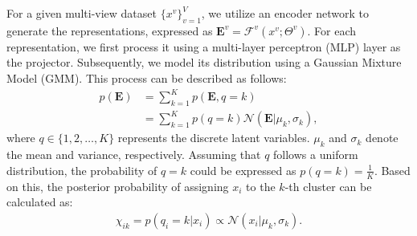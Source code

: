 \documentclass{article}
\theoremstyle{plain}
\theoremstyle{definition}
\theoremstyle{remark}
\begin{document}
For a given multi-view dataset $\{x^v\}_{v=1}^{V}$, we utilize an encoder network to generate the representations, expressed as $\textbf{E}^v = \mathcal{F}^v(x^v; \Theta^v)$. For each representation, we first process it using a multi-layer perceptron (MLP) layer as the projector. Subsequently, we model its distribution using a Gaussian Mixture Model (GMM). This process can be described as follows:
\begin{equation}
\begin{aligned}
p(\textbf{E}) &= \sum_{k=1}^K p(\textbf{E}, q=k) \\
              &= \sum_{k=1}^K p(q=k)\mathcal{N}(\textbf{E}|\mu_k, \sigma_k), 
\end{aligned}
\label{loss_con}
\end{equation}
where $q \in \{1, 2, \dots, K\}$ represents the discrete latent variables. $\mu_k$ and $\sigma_k$ denote the mean and variance, respectively. Assuming that $q$ follows a uniform distribution, the probability of $q = k$ could be expressed as $p(q = k) = \frac{1}{K}$. Based on this, the posterior probability of assigning $x_i$ to the $k$-th cluster can be calculated as:
\begin{equation}
\begin{aligned}
\chi_{ik} = p(q_i =k|x_i) \propto \mathcal{N}(x_i|\mu_k, \sigma_k).
\end{aligned}
\label{poster_pro}
\end{equation}
\end{document}
